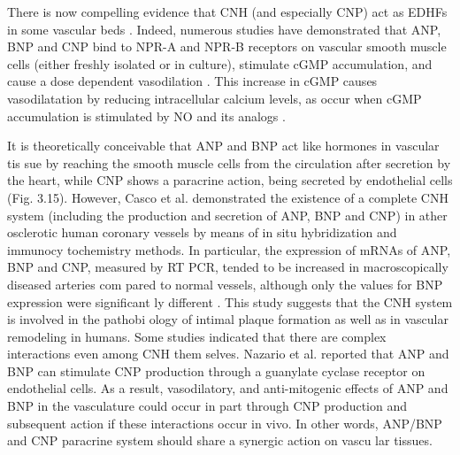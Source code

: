 \documentclass[14pt,a4paper,onecolumn]{extarticle}
\begin{document}
There is now compelling evidence that CNH (and especially CNP) act as EDHFs in some vascular beds \citep{267}  \citep{269} \citep{270} \citep{271}. Indeed, numerous studies have demonstrated that ANP, BNP and CNP bind to NPR-A and NPR-B receptors on vascular smooth muscle cells (either freshly isolated or in culture), stimulate cGMP accumulation, and cause a dose dependent vasodilation  \citep{269} \citep{270} \citep{271}. This increase in cGMP causes vasodilatation by reducing intracellular calcium levels, as occur when cGMP accumulation is stimulated by NO and its analogs .

It is theoretically conceivable that ANP and BNP act like hormones in vascular tis sue by reaching the smooth muscle cells from the circulation after secretion by the heart, while CNP shows a paracrine action, being secreted by endothelial cells \citep{57} \citep{84} \citep{87} \citep{88} (Fig. 3.15). However, Casco et al. \citep{272} demonstrated the existence of a complete CNH system (including the production and secretion of ANP, BNP and CNP) in ather osclerotic human coronary vessels by means of in situ hybridization and immunocy tochemistry methods. In particular, the expression of mRNAs of ANP, BNP and CNP, measured by RT PCR, tended to be increased in macroscopically diseased arteries com pared to normal vessels, although only the values for BNP expression were significant ly different \citep{272}. This study suggests that the CNH system is involved in the pathobi ology of intimal plaque formation as well as in vascular remodeling in humans.  Some studies indicated that there are complex interactions even among CNH them selves. Nazario et al. \citep{273} reported that ANP and BNP can stimulate CNP production through a guanylate cyclase receptor on endothelial cells. As a result, vasodilatory, and anti-mitogenic effects of ANP and BNP in the vasculature could occur in part through CNP production and subsequent action if these interactions occur in vivo. In other words, ANP/BNP and CNP paracrine system should share a synergic action on vascu lar tissues.
\end{document}

